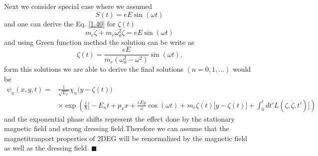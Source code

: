 \noindent
Next we consider special case where we assumed
\begin{equation} \label{1.49}
  S(t) = eE\sin(\omega t)
\end{equation}
and one can derive the Eq. \eqref{1.40} for $\zeta(t)$
\begin{equation} \label{1.50}
  m_e\ddot{\zeta} + m_e\omega_0^2\zeta = eE\sin(\omega t)
\end{equation}
and using Green function method the solution can be write as
\begin{equation} \label{1.51}
  \zeta(t) = \frac{eE}{m_e(\omega_0^2 - \omega^2)}\sin(\omega t).
\end{equation}
form this solutions we are able to derive the final solutions $(n=0,1,...)$ would be
\begin{equation} \label{1.52}
  \begin{aligned}
    \psi_n(x,y,t)  = & \frac{1}{\sqrt{L_x}} \chi_n\big(y - \zeta(t)\big) \\
    & \times
      \exp(
     \frac{i}{\hbar}\bigg[- E_nt +
    p_x x +
    \frac{eEy}{\omega}\cos(\omega t)+
    m_e\dot{\zeta(t)}\big[y-\zeta(t)\big]
     + \int_0^{t}dt'L(\zeta,\dot{\zeta},t')\bigg])
  \end{aligned}
\end{equation}
and the exponential phase shifts represent the effect done by the stationary magnetic field and strong dressing field.Therefore we can assume that the magnetitranport properties of 2DEG will be renormalized by the magnetic field as well as the dressing field.
\hfill$\blacksquare$

